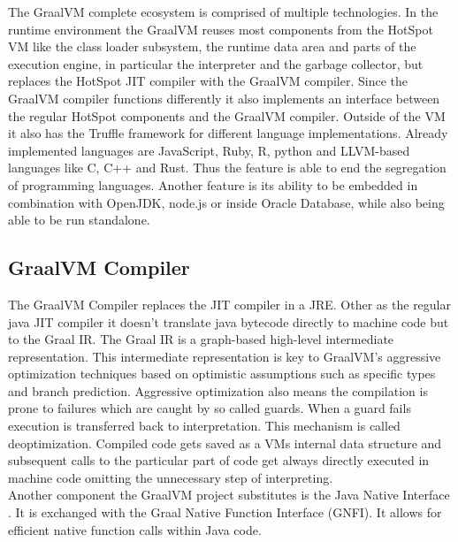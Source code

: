 The GraalVM complete ecosystem is comprised of multiple technologies. In the runtime environment the GraalVM reuses most components from the HotSpot VM like the class loader subsystem, the runtime data area and parts of the execution engine, in particular the interpreter and the garbage collector, but replaces the HotSpot JIT compiler with the GraalVM compiler. Since the GraalVM compiler functions differently it also implements an interface between the regular HotSpot components and the GraalVM compiler. Outside of the VM it also has the Truffle framework for different language implementations. Already implemented languages are JavaScript, Ruby, R, python and LLVM-based languages like C, C++ and Rust. Thus the feature is able to end the segregation of programming languages. Another feature is its ability to be embedded in combination with OpenJDK, node.js or inside Oracle Database, while also being able to be run standalone.
\subsection{GraalVM Compiler}\label{sec:graalcomp}
The GraalVM Compiler replaces the JIT compiler in a JRE. Other as the regular java JIT compiler it doesn't translate java bytecode directly to machine code but to the Graal IR. \cite{inproceedings} The Graal IR is a graph-based high-level intermediate representation. This intermediate representation is key to GraalVM's aggressive optimization techniques based on optimistic assumptions such as specific types and branch prediction. Aggressive optimization also means the compilation is prone to failures which are caught by so called guards. When a guard fails execution is transferred back to interpretation. This mechanism is called deoptimization. \cite{ChambDeopt} Compiled code gets saved as a VMs internal data structure and subsequent calls to the particular part of code get always directly executed in machine code omitting the unnecessary step of interpreting.\\
Another component the GraalVM project substitutes is the Java Native Interface \cite{Lindholm}. It is exchanged with the Graal Native Function Interface (GNFI). \cite{grimmerNative} It allows for efficient native function calls within Java code.
